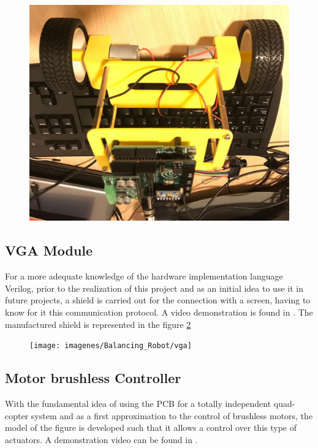 \begin{center}
	\begin{figure}[H]
		\center
		\includegraphics[scale=0.3, angle=180]{imagenes/Balancing_Robot/test2}
		\caption{}
		\label{fig:test2}
	\end{figure}
\end{center}

\subsection{VGA Module}
For a more adequate knowledge of the hardware implementation language Verilog, prior to the realization of this project and as an initial idea to use it in future projects, a shield is carried out for the connection with a screen, having to know for it this communication protocol. A video demonstration is found in \cite{vga}. \newline
The manufactured shield is represented in the figure \ref{fig:vga}

\begin{center}
	\begin{figure}[H]
		\center
		\texttt{[image: imagenes/Balancing\_Robot/vga]}
		\caption{}
		\label{fig:vga}
	\end{figure}
\end{center}
\subsection{Motor brushless Controller}
With the fundamental idea of using the PCB for a totally independent quad-copter system and as a first approximation to the control of brushless motors, the model of the figure is developed such that it allows a control over this type of actuators.
A demonstration video can be found in \cite{brushless1}.